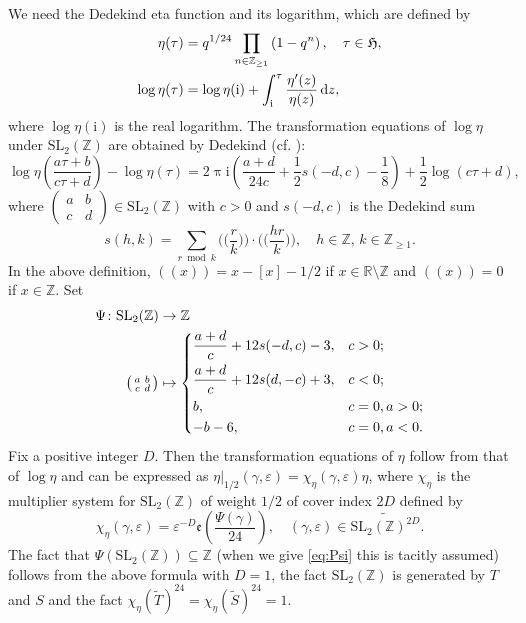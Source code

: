 \documentclass[12pt]{amsart}
\numberwithin{equation}{section}
\theoremstyle{plain}
\theoremstyle{definition}
\theoremstyle{remark}
\newcommand\rmi{\mathrm{i}}
\newcommand\tbtmat[4]{\left(\begin{smallmatrix}{#1} & {#2} \\ {#3} & {#4}\end{smallmatrix}\right)}
\newcommand\etp[1]{\mathfrak{e}\left(#1\right)}
\newcommand\diff{\,\mathrm{d}}
\newcommand\numZ{\mathbb{Z}}
\newcommand\numR{\mathbb{R}}
\newcommand\numgeq[2]{\mathbb{#1}_{\geq #2}}
\newcommand\slZ{\mathrm{SL}_2(\mathbb{Z})}
\newcommand\uhp{\mathfrak{H}}
\newcommand\Dcover[2]{\widetilde{#1^{#2}}}
\begin{document}
We need the Dedekind eta function and its logarithm, which are defined by
\begin{align}
\eta(\tau)&=q^{1/24}\prod_{n\in\numgeq{Z}{1}}\left(1-q^n\right),\quad\tau\in\uhp, \notag\\
\log\eta(\tau)&=\log\eta(\rmi)+\int_{\rmi}^{\tau}\frac{\eta'(z)}{\eta(z)}\diff z, \label{eq:logeta}
\end{align}
where $\log\eta(\rmi)$ is the real logarithm. The transformation equations of $\log\eta$ under $\slZ$ are obtained by Dedekind (cf. \cite[Equation (12), Section 3.4]{Apo90}):
\begin{equation}
\label{eq:transLogEta}
\log\eta\left(\frac{a\tau+b}{c\tau+d}\right)-\log\eta(\tau)=2\uppi\rmi\left(\frac{a+d}{24c}+\frac{1}{2}s(-d,c)-\frac{1}{8}\right)+\frac{1}{2}\log(c\tau+d),
\end{equation}
where $\tbtmat{a}{b}{c}{d} \in \slZ$ with $c>0$ and $s(-d,c)$ is the Dedekind sum
\begin{equation}
\label{eq:DedekindSum}
s(h,k)=\sum_{r \bmod k}\Big(\Big(\frac{r}{k}\Big)\Big)\cdot\Big(\Big(\frac{hr}{k}\Big)\Big),\quad h\in\numZ,\,k\in\numgeq{Z}{1}.
\end{equation}
In the above definition, $((x))=x-[x]-1/2$ if $x\in\numR\setminus\numZ$ and $((x))=0$ if $x\in\numZ$.
Set
\begin{align}
\label{eq:Psi}
\Psi\colon \slZ &\rightarrow \numZ \\
\tbtmat{a}{b}{c}{d} &\mapsto \begin{dcases}
\frac{a+d}{c}+12s(-d,c)-3,   & c>0; \\
\frac{a+d}{c}+12s(d,-c)+3,   & c<0; \\
b,                           & c=0, a>0; \\
-b-6,                        & c=0, a<0. 
\end{dcases}\notag
\end{align}
Fix a positive integer $D$. Then the transformation equations of $\eta$ follow from that of $\log\eta$ and can be expressed as $\eta\vert_{1/2}(\gamma,\varepsilon)=\chi_{\eta}(\gamma,\varepsilon)\eta$, where $\chi_{\eta}$ is the multiplier system for $\slZ$ of weight $1/2$ of cover index $2D$ defined by
\begin{equation*}
\chi_{\eta}(\gamma,\varepsilon)=\varepsilon^{-D}\etp{\frac{\Psi(\gamma)}{24}},\quad(\gamma,\varepsilon)\in\Dcover{\slZ}{2D}.
\end{equation*}
The fact that $\Psi(\slZ)\subseteq\numZ$ (when we give \eqref{eq:Psi} this is tacitly assumed) follows from the above formula with $D=1$, the fact $\slZ$ is generated by $T$ and $S$ and the fact $\chi_{\eta}(\widetilde{T})^{24}=\chi_{\eta}(\widetilde{S})^{24}=1$.
\end{document}
